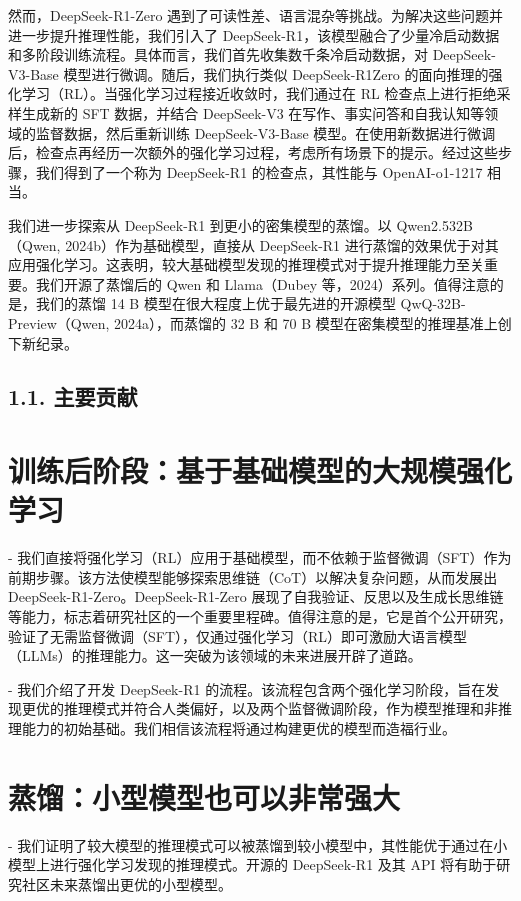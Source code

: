 \documentclass[12pt,a4paper]{report} %
\begin{document}
然而，DeepSeek-R1-Zero 遇到了可读性差、语言混杂等挑战。为解决这些问题并进一步提升推理性能，我们引入了 DeepSeek-R1，该模型融合了少量冷启动数据和多阶段训练流程。具体而言，我们首先收集数千条冷启动数据，对 DeepSeek-V3-Base 模型进行微调。随后，我们执行类似 DeepSeek-R1Zero 的面向推理的强化学习（RL）。当强化学习过程接近收敛时，我们通过在 RL 检查点上进行拒绝采样生成新的 SFT 数据，并结合 DeepSeek-V3 在写作、事实问答和自我认知等领域的监督数据，然后重新训练 DeepSeek-V3-Base 模型。在使用新数据进行微调后，检查点再经历一次额外的强化学习过程，考虑所有场景下的提示。经过这些步骤，我们得到了一个称为 DeepSeek-R1 的检查点，其性能与 OpenAI-o1-1217 相当。


我们进一步探索从 DeepSeek-R1 到更小的密集模型的蒸馏。以 Qwen2.532B（Qwen, 2024b）作为基础模型，直接从 DeepSeek-R1 进行蒸馏的效果优于对其应用强化学习。这表明，较大基础模型发现的推理模式对于提升推理能力至关重要。我们开源了蒸馏后的 Qwen 和 Llama（Dubey 等，2024）系列。值得注意的是，我们的蒸馏 14 B 模型在很大程度上优于最先进的开源模型 QwQ-32B-Preview（Qwen, 2024a），而蒸馏的 32 B 和 70 B 模型在密集模型的推理基准上创下新纪录。
\subsection*{1.1. 主要贡献}


\section*{训练后阶段：基于基础模型的大规模强化学习}


- 我们直接将强化学习（RL）应用于基础模型，而不依赖于监督微调（SFT）作为前期步骤。该方法使模型能够探索思维链（CoT）以解决复杂问题，从而发展出 DeepSeek-R1-Zero。DeepSeek-R1-Zero 展现了自我验证、反思以及生成长思维链等能力，标志着研究社区的一个重要里程碑。值得注意的是，它是首个公开研究，验证了无需监督微调（SFT），仅通过强化学习（RL）即可激励大语言模型（LLMs）的推理能力。这一突破为该领域的未来进展开辟了道路。


- 我们介绍了开发 DeepSeek-R1 的流程。该流程包含两个强化学习阶段，旨在发现更优的推理模式并符合人类偏好，以及两个监督微调阶段，作为模型推理和非推理能力的初始基础。我们相信该流程将通过构建更优的模型而造福行业。


\section*{蒸馏：小型模型也可以非常强大}


- 我们证明了较大模型的推理模式可以被蒸馏到较小模型中，其性能优于通过在小模型上进行强化学习发现的推理模式。开源的 DeepSeek-R1 及其 API 将有助于研究社区未来蒸馏出更优的小型模型。
\end{document}
